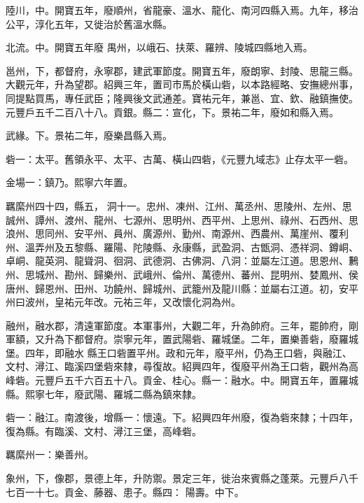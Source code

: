 \begin{pinyinscope}
 陸川，中。開寶五年，廢順州，省龍豪、溫水、龍化、南河四縣入焉。九年，移治公平，淳化五年，又徙治於舊溫水縣。



 北流。中。開寶五年廢
 禺州，以峨石、扶萊、羅辨、陵城四縣地入焉。



 邕州，下，都督府，永寧郡，建武軍節度。開寶五年，廢朗寧、封陵、思龍三縣。大觀元年，升為望郡。紹興三年，置司市馬於橫山砦，以本路經略、安撫總州事，同提點買馬，專任武臣；隆興後文武通差。寶祐元年，兼邕、宜、欽、融鎮撫使。元豐戶五千二百八十八。貢銀。縣二：宣化，下。景祐二年，廢如和縣入焉。



 武緣。下。景祐二年，廢樂昌縣入焉。



 砦一：太平。舊領永平、太平、古萬、橫山四砦，《元豐九域志》止存太平一砦。



 金場一：鎮乃。熙寧六年置。



 羈縻州四十四，縣五，
 洞十一。忠州、凍州、江州、萬丞州、思陵州、左州、思誠州、譚州、渡州、龍州、七源州、思明州、西平州、上思州、祿州、石西州、思浪州、思同州、安平州、員州、廣源州、勤州、南源州、西農州、萬崖州、覆利州、溫弄州及五黎縣、羅陽、陀陵縣、永康縣，武盈洞、古甑洞、憑祥洞、鐏峒、卓峒、龍英洞、龍聳洞、徊洞、武德洞、古佛洞、八洞：並屬左江道。思恩州、鶼州、思城州、勘州、歸樂州、武峨州、倫州、萬德州、蕃州、昆明州、婪鳳州、侯唐州、歸恩州、田州、功饒州、歸城州、武籠州及龍川縣：並屬右江道。初，安平州曰波州，皇祐元年改。元祐三年，又改懷化洞為州。



 融州，融水郡，清遠軍節度。本軍事州，大觀二年，升為帥府。三年，罷帥府，剛軍額，又升為下都督府。崇寧元年，置武陽砦、羅城堡。二年，置樂善砦，廢羅城堡。四年，即融水
 縣王口砦置平州。政和元年，廢平州，仍為王口砦，與融江、文村、潯江、臨溪四堡砦來隸，尋復故。紹興四年，復廢平州為王口砦，觀州為高峰砦。元豐戶五千六百五十八。貢金、桂心。縣一：融水。中。開寶五年，置羅城縣。熙寧七年，廢武陽、羅城二縣為鎮來隸。



 砦一：融江。南渡後，增縣一：懷遠。下。紹興四年州廢，復為砦來隸；十四年，復為縣。有臨溪、文村、潯江三堡，高峰砦。



 羈縻州一：樂善州。



 象州，下，像郡，景德上年，升防禦。景定三年，徙治來賓縣之蓬萊。元豐戶八千七百一十七。貢金、藤器、患子。縣四：
 陽壽。中下。




\end{pinyinscope}
